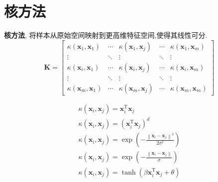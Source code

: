 \documentclass{article}
\newcommand{\defi}[2]{\textbf{#1}, #2}
\begin{document}
\section{核方法}
    \defi{核方法}{将样本从原始空间映射到更高维特征空间,使得其线性可分.}
        \[\mathbf{K}=\left[\begin{array}{ccccc}
            \kappa\left(\boldsymbol{x}_{1}, \boldsymbol{x}_{1}\right) & \cdots & \kappa\left(\boldsymbol{x}_{1}, \boldsymbol{x}_{j}\right) & \cdots & \kappa\left(\boldsymbol{x}_{1}, \boldsymbol{x}_{m}\right) \\
            \vdots & \ddots & \vdots & \ddots & \vdots \\
            \kappa\left(\boldsymbol{x}_{i}, \boldsymbol{x}_{1}\right) & \cdots & \kappa\left(\boldsymbol{x}_{i}, \boldsymbol{x}_{j}\right) & \cdots & \kappa\left(\boldsymbol{x}_{i}, \boldsymbol{x}_{m}\right) \\
            \vdots & \ddots & \vdots & \ddots & \vdots \\
            \kappa\left(\boldsymbol{x}_{m}, \boldsymbol{x}_{1}\right) & \cdots & \kappa\left(\boldsymbol{x}_{m}, \boldsymbol{x}_{j}\right) & \cdots & \kappa\left(\boldsymbol{x}_{m}, \boldsymbol{x}_{m}\right)
        \end{array}\right]\]
        
        \[\begin{array}{l}
            \kappa\left(\boldsymbol{x}_{i}, \boldsymbol{x}_{j}\right)=\boldsymbol{x}_{i}^{\mathrm{T}} \boldsymbol{x}_{j} \\
            \kappa\left(\boldsymbol{x}_{i}, \boldsymbol{x}_{j}\right)=\left(\boldsymbol{x}_{i}^{\mathrm{T}} \boldsymbol{x}_{j}\right)^{d} \\
            \kappa\left(\boldsymbol{x}_{i}, \boldsymbol{x}_{j}\right)=\exp \left(-\frac{\left\|\boldsymbol{x}_{i}-\boldsymbol{x}_{j}\right\|^{2}}{2 \sigma^{2}}\right) \\
            \kappa\left(\boldsymbol{x}_{i}, \boldsymbol{x}_{j}\right)=\exp \left(-\frac{\left\|\boldsymbol{x}_{i}-\boldsymbol{x}_{j}\right\|}{\sigma}\right) \\
            \kappa\left(\boldsymbol{x}_{i}, \boldsymbol{x}_{j}\right)=\tanh \left(\beta \boldsymbol{x}_{i}^{\mathrm{T}} \boldsymbol{x}_{j}+\theta\right)
        \end{array}\]
		
\end{document}
